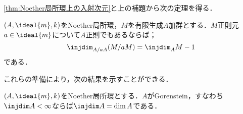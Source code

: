 \ref{thm:Noether局所環上の入射次元}と上の補題から次の定理を得る．
\begin{thm}\label{thm:injdim A/aA=injdim A-1}
	$(A,\ideal{m},k)$をNoether局所環，$M$を有限生成$A$加群とする．$M$正則元$a\in\ideal{m}$について$A$正則でもあるならば；
	\[\injdim_{A/aA}(M/aM)=\injdim_A M-1\]
	である．
\end{thm}
%

これらの準備により，次の結果を示すことができる．

\begin{thm}\label{thm:Gorensteinのinjdim}
	$(A,\ideal{m},k)$をNoether局所環とする．$A$がGorenstein，すなわち$\injdim A<\infty$ならば$\injdim A=\dim A$である．
\end{thm}

